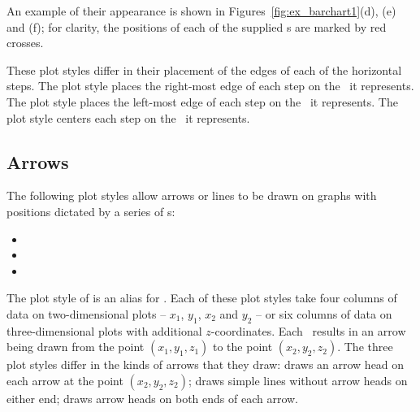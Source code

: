 An example of their appearance  is shown in Figures~\ref{fig:ex_barchart1}(d),
(e) and (f); for clarity, the positions of each of the supplied \datapoint s
are marked by red crosses.

These plot styles differ in their placement of the edges of each of the
horizontal steps.  The  plot style places the right-most edge of
each step on the \datapoint\ it represents.  The  plot style
places the left-most edge of each step on the \datapoint\ it represents.  The
 plot style centers each step on the \datapoint\ it represents.

\subsection{Arrows}

The following plot styles allow arrows or lines to be drawn on graphs with
positions dictated by a series of \datapoint s:
\begin{itemize}
\item {}
\item {}
\item {}
\end{itemize}
The plot style of  is an alias for .  Each
of these plot styles take four columns of data on two-dimensional plots --
$x_1$, $y_1$, $x_2$ and $y_2$ -- or six columns of data on three-dimensional
plots with additional $z$-coordinates. Each \datapoint\ results in an arrow
being drawn from the point $(x_1,y_1,z_1)$ to the point $(x_2,y_2,z_2)$. The
three plot styles differ in the kinds of arrows that they draw:
 draws an arrow head on each arrow at the point
$(x_2,y_2,z_2)$;  draws simple lines without arrow heads
on either end;  draws arrow heads on both ends of each
arrow.

